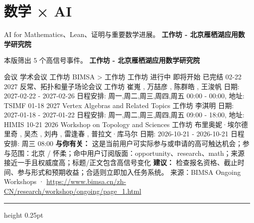 \documentclass[10.5pt]{ctexart}
\begin{document}
\section*{数学 × AI}
{\color{ormuted} AI for Mathematics、Lean、证明与重要数学进展。}
\vspace{2mm}
{\LARGE\bfseries 工作坊 - 北京雁栖湖应用数学研究院}\par
\vspace{1mm}
{\color{ormuted} 本版筛出 5 个高信号事件。}
\vspace{3mm}
{\Large\bfseries 工作坊 - 北京雁栖湖应用数学研究院}\par
会议 学术会议 工作坊 BIMSA > 工作坊 工作坊 进行中 即将开始 已完结 02-22 2027 反常、拓扑和量子场论会议 工作坊 崔嵬 , 万喆彦 , 陈群皓 , 王浚帆 日期: 2027-02-22 - 2027-02-26 日程安排: 周一,周二,周三,周四,周五 00:00 - 00:00, 地址: TSIMF 01-18 2027 Vertex Algebras and Related Topics 工作坊 李淇明 日期: 2027-01-18 - 2027-01-22 日程安排: 周一,周二,周三,周四,周五 09:00 - 18:00, 地址: HIMIS 10-21 2026 Workshop on Topology and Sciences 工作坊 布里奥妮·埃尔德里奇 , 吴杰 , 刘冉 , 雷逢春 , 普拉文·库马尔 日期: 2026-10-21 - 2026-10-21 日程安排: 周三 08:00
\textbf{与你有关：} 这是当前用户可实际参与或申请的高可触达机会；参与范围：北京 / 怀柔；命中用户订阅版面：opportunity、research、math；来源接近一手且权威度高；标题/正文包含高信号变化
\textbf{建议：} 检查报名资格、截止时间、参与形式和预期收益；合适则立即加入任务系统。
{\footnotesize\color{ormuted} 来源：BIMSA Ongoing Workshops · \url{https://www.bimsa.cn/zh-CN/research/workshop/ongoing/page_1.html}}
\vspace{4mm}
\hrule height 0.25pt
\vspace{3mm}
\end{document}
